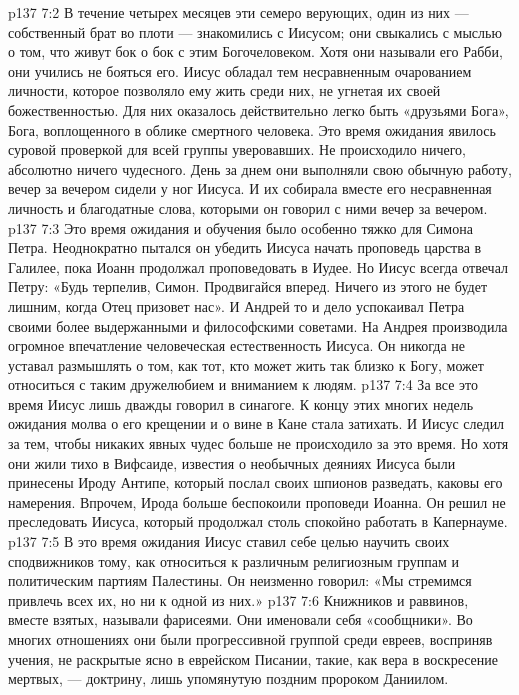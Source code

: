 \vs p137 7:2 В течение четырех месяцев эти семеро верующих, один из них --- собственный брат во плоти --- знакомились с Иисусом; они свыкались с мыслью о том, что живут бок о бок с этим Богочеловеком. Хотя они называли его Рабби, они учились не бояться его. Иисус обладал тем несравненным очарованием личности, которое позволяло ему жить среди них, не угнетая их своей божественностью. Для них оказалось действительно легко быть «друзьями Бога», Бога, воплощенного в облике смертного человека. Это время ожидания явилось суровой проверкой для всей группы уверовавших. Не происходило ничего, абсолютно ничего чудесного. День за днем они выполняли свою обычную работу, вечер за вечером сидели у ног Иисуса. И их собирала вместе его несравненная личность и благодатные слова, которыми он говорил с ними вечер за вечером.
\vs p137 7:3 Это время ожидания и обучения было особенно тяжко для Симона Петра. Неоднократно пытался он убедить Иисуса начать проповедь царства в Галилее, пока Иоанн продолжал проповедовать в Иудее. Но Иисус всегда отвечал Петру: «Будь терпелив, Симон. Продвигайся вперед. Ничего из этого не будет лишним, когда Отец призовет нас». И Андрей то и дело успокаивал Петра своими более выдержанными и философскими советами. На Андрея производила огромное впечатление человеческая естественность Иисуса. Он никогда не уставал размышлять о том, как тот, кто может жить так близко к Богу, может относиться с таким дружелюбием и вниманием к людям.
\vs p137 7:4 За все это время Иисус лишь дважды говорил в синагоге. К концу этих многих недель ожидания молва о его крещении и о вине в Кане стала затихать. И Иисус следил за тем, чтобы никаких явных чудес больше не происходило за это время. Но хотя они жили тихо в Вифсаиде, известия о необычных деяниях Иисуса были принесены Ироду Антипе, который послал своих шпионов разведать, каковы его намерения. Впрочем, Ирода больше беспокоили проповеди Иоанна. Он решил не преследовать Иисуса, который продолжал столь спокойно работать в Капернауме.
\vs p137 7:5 В это время ожидания Иисус ставил себе целью научить своих сподвижников тому, как относиться к различным религиозным группам и политическим партиям Палестины. Он неизменно говорил: «Мы стремимся привлечь всех их, но  ни к одной из них.»
\vs p137 7:6 \pc Книжников и раввинов, вместе взятых, называли фарисеями. Они именовали себя «сообщники». Во многих отношениях они были прогрессивной группой среди евреев, восприняв учения, не раскрытые ясно в еврейском Писании, такие, как вера в воскресение мертвых, --- доктрину, лишь упомянутую поздним пророком Даниилом.
